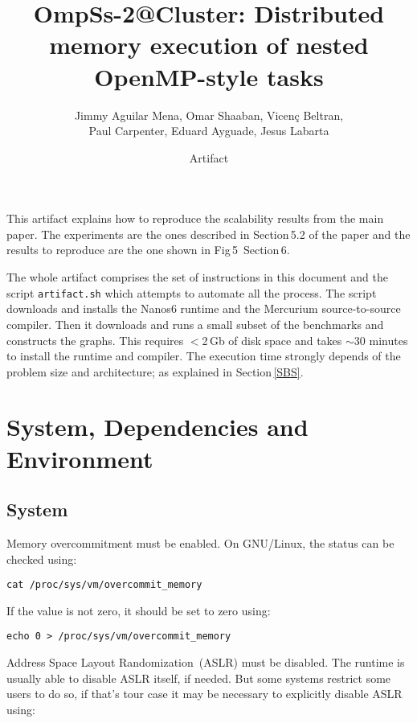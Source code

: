\documentclass{article}
\newcommand{\code}[1]{\texttt{#1}}
\begin{document}
\title{OmpSs-2@Cluster: Distributed memory execution of nested OpenMP-style tasks}

\author{Jimmy Aguilar Mena, Omar Shaaban, Vicen\c{c} Beltran,\\
  Paul Carpenter, Eduard Ayguade, Jesus Labarta}
\date{Artifact}

\maketitle

This artifact explains how to reproduce the scalability results from
the main paper.  The experiments are the ones described in
Section\,5.2 of the paper and the results to reproduce are the one
shown in Fig\,5~Section\,6.

The whole artifact comprises the set of instructions in this document
and the script \code{artifact.sh} which attempts to automate all the
process.  The script downloads and installs the Nanos6 runtime and the
Mercurium source-to-source compiler.  Then it downloads and runs a
small subset of the benchmarks and constructs the graphs.  This
requires $<$2\,Gb of disk space and takes $\sim$30 minutes to install
the runtime and compiler.  The execution time strongly depends of the
problem size and architecture; as explained in Section\,\ref{SBS}.

\section{System, Dependencies and Environment}

\subsection{System}

Memory overcommitment must be enabled. On GNU/Linux, the status can be
checked using:

\begin{lstlisting}
cat /proc/sys/vm/overcommit_memory
\end{lstlisting}

If the value is not zero, it should be set to zero using:

\begin{lstlisting}
echo 0 > /proc/sys/vm/overcommit_memory
\end{lstlisting}

Address Space Layout Randomization~(ASLR) must be disabled.  The
runtime is usually able to disable ASLR itself, if needed. But some
systems restrict some users to do so, if that's tour case it may be
necessary to explicitly disable ASLR using:
\end{document}
